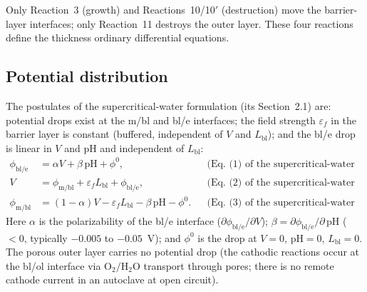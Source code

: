 \begin{table}[htbp]
\centering
\caption{Reaction at the ol/water interface ($x = -L_{\mathrm{ol}}$).}
\label{tab:rxn-ole}
\end{table}

Only Reaction~3 (growth) and Reactions~10/10$'$ (destruction) move the
barrier-layer interfaces; only Reaction~11 destroys the outer layer. These four
reactions define the thickness ordinary differential equations.

\subsection{Potential distribution}
\label{sec:potential}

The postulates of the supercritical-water formulation (its Section~2.1) are:
potential drops exist at the m/bl and bl/e interfaces; the field strength
$\varepsilon_f$ in the barrier layer is constant (buffered, independent of $V$
and $L_{\mathrm{bl}}$); and the bl/e drop is linear in $V$ and pH and
independent of $L_{\mathrm{bl}}$:
\begin{align}
\phi_{\mathrm{bl/e}} &= \alpha V + \beta\,\mathrm{pH} + \phi^0 ,
&&\text{(Eq.~(1) of the supercritical-water formulation)} \\
V &= \phi_{\mathrm{m/bl}} + \varepsilon_f L_{\mathrm{bl}} + \phi_{\mathrm{bl/e}} ,
&&\text{(Eq.~(2) of the supercritical-water formulation)} \\
\phi_{\mathrm{m/bl}} &= (1-\alpha) V - \varepsilon_f L_{\mathrm{bl}}
- \beta\,\mathrm{pH} - \phi^0 .
&&\text{(Eq.~(3) of the supercritical-water formulation)}
\end{align}
Here $\alpha$ is the polarizability of the bl/e interface
($\partial \phi_{\mathrm{bl/e}} / \partial V$);
$\beta = \partial \phi_{\mathrm{bl/e}} / \partial\,\mathrm{pH}$
($< 0$, typically $-0.005$ to $-0.05$~V); and $\phi^0$ is the drop at $V = 0$,
$\mathrm{pH} = 0$, $L_{\mathrm{bl}} = 0$. The porous outer layer carries no
potential drop (the cathodic reactions occur at the bl/ol interface via
$\mathrm{O_2}/\mathrm{H_2O}$ transport through pores; there is no remote
cathode current in an autoclave at open circuit).

